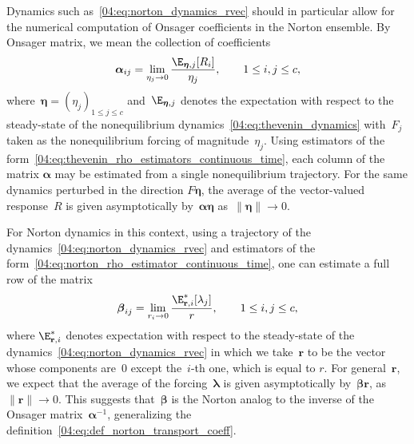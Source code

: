     Dynamics such as~\eqref{04:eq:norton_dynamics_rvec} should in particular allow for the numerical computation of Onsager coefficients in the Norton ensemble.
    By Onsager matrix, we mean the collection of coefficients
    \begin{equation}
        {\boldsymbol{\alpha}}_{ij} = \underset{{\eta_j\to 0}}{\lim}\,\frac{\E_{\boldsymbol{\eta},j}[R_i]}{\eta_j},\qquad 1\leq i,j\leq c,
    \end{equation}
    where~$\boldsymbol{\eta} = (\eta_j)_{1\leq j \leq c}$ and~$\E_{\boldsymbol{\eta},j}$ denotes the expectation with respect to the steady-state of the nonequilibrium dynamics~\eqref{04:eq:thevenin_dynamics} with~$F_j$ taken as the nonequilibrium forcing of magnitude~$\eta_j$. Using estimators of the form~\eqref{04:eq:thevenin_rho_estimators_continuous_time}, each column of the matrix $\boldsymbol{\alpha}$ may be estimated from a single nonequilibrium trajectory.
    For the same dynamics perturbed in the direction $F\boldsymbol{\eta}$, the average of the vector-valued response~$R$ is given asymptotically by~$\boldsymbol{\alpha}\boldsymbol{\eta}$ as~$\|\boldsymbol{\eta}\|\to 0$.

   For Norton dynamics in this context, using a trajectory of the dynamics~\eqref{04:eq:norton_dynamics_rvec} and estimators of the form~\eqref{04:eq:norton_rho_estimator_continuous_time}, one can estimate a full row of the matrix
    $$ {\boldsymbol{\beta}}_{ij} = \underset{r_i\to 0}{\lim}\, \frac{\E_{\mathbf{r},i}^*[\lambda_j]}{r},\qquad 1\leq i,j\leq c,$$
    where $\E_{\mathbf{r},i}^*$ denotes expectation with respect to the steady-state of the dynamics~\eqref{04:eq:norton_dynamics_rvec} in which we take~$\mathbf{r}$ to be the vector whose components are~0 except the~$i$-th one, which is equal to $r$. For general~$\mathbf r$, we expect that the average of the forcing~$\boldsymbol{\lambda}$ is given asymptotically by~$\boldsymbol{\beta}\mathbf{r}$, as $\|\mathbf{r}\|\to 0$. This suggests that~$\boldsymbol{\beta}$ is the Norton analog to the inverse of the Onsager matrix~$\boldsymbol{\alpha}^{-1}$, generalizing the definition~\eqref{04:eq:def_norton_transport_coeff}.
